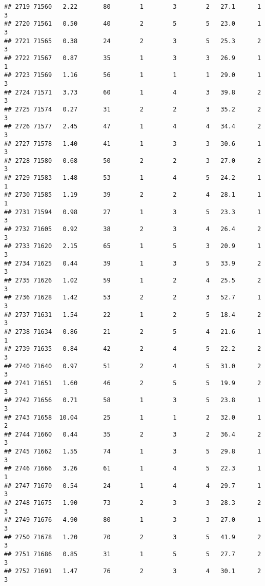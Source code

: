 \documentclass[
]{article}
\begin{document}
\begin{verbatim}
## 2719 71560   2.22       80        1        3        2   27.1      1      3
## 2720 71561   0.50       40        2        5        5   23.0      1      3
## 2721 71565   0.38       24        2        3        5   25.3      2      3
## 2722 71567   0.87       35        1        3        3   26.9      1      1
## 2723 71569   1.16       56        1        1        1   29.0      1      3
## 2724 71571   3.73       60        1        4        3   39.8      2      3
## 2725 71574   0.27       31        2        2        3   35.2      2      3
## 2726 71577   2.45       47        1        4        4   34.4      2      3
## 2727 71578   1.40       41        1        3        3   30.6      1      3
## 2728 71580   0.68       50        2        2        3   27.0      2      3
## 2729 71583   1.48       53        1        4        5   24.2      1      1
## 2730 71585   1.19       39        2        2        4   28.1      1      1
## 2731 71594   0.98       27        1        3        5   23.3      1      3
## 2732 71605   0.92       38        2        3        4   26.4      2      3
## 2733 71620   2.15       65        1        5        3   20.9      1      3
## 2734 71625   0.44       39        1        3        5   33.9      2      3
## 2735 71626   1.02       59        1        2        4   25.5      2      3
## 2736 71628   1.42       53        2        2        3   52.7      1      3
## 2737 71631   1.54       22        1        2        5   18.4      2      3
## 2738 71634   0.86       21        2        5        4   21.6      1      1
## 2739 71635   0.84       42        2        4        5   22.2      2      3
## 2740 71640   0.97       51        2        4        5   31.0      2      3
## 2741 71651   1.60       46        2        5        5   19.9      2      3
## 2742 71656   0.71       58        1        3        5   23.8      1      3
## 2743 71658  10.04       25        1        1        2   32.0      1      2
## 2744 71660   0.44       35        2        3        2   36.4      2      3
## 2745 71662   1.55       74        1        3        5   29.8      1      3
## 2746 71666   3.26       61        1        4        5   22.3      1      1
## 2747 71670   0.54       24        1        4        4   29.7      1      3
## 2748 71675   1.90       73        2        3        3   28.3      2      3
## 2749 71676   4.90       80        1        3        3   27.0      1      3
## 2750 71678   1.20       70        2        3        5   41.9      2      3
## 2751 71686   0.85       31        1        5        5   27.7      2      3
## 2752 71691   1.47       76        2        3        4   30.1      2      3

\end{verbatim}
\end{document}

